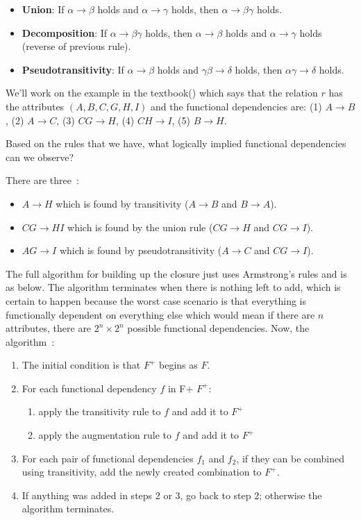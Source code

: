 \begin{itemize}
	\item \textbf{Union}: If $\alpha \rightarrow \beta$ holds and $\alpha \rightarrow \gamma$ holds, then $\alpha \rightarrow \beta\gamma$ holds.
	\item \textbf{Decomposition}: If $\alpha \rightarrow \beta\gamma$ holds, then  $\alpha \rightarrow \beta$ holds and $\alpha \rightarrow \gamma$ holds (reverse of previous rule).
	\item \textbf{Pseudotransitivity}: If $\alpha \rightarrow \beta$ holds and $\gamma\beta \rightarrow \delta$ holds, then $\alpha\gamma \rightarrow \delta$ holds.
\end{itemize}

We'll work on the example in the textbook(\cite{dsc}) which says that the relation $r$ has the attributes $(A, B, C, G, H, I)$ and the functional dependencies are: (1) $A \rightarrow B$, (2) $A \rightarrow C$, (3) $CG \rightarrow H$, (4) $CH \rightarrow I$, (5) $B \rightarrow H$.

Based on the rules that we have, what logically implied functional dependencies can we observe? 

There are three~\cite{dsc}:
\begin{itemize}
	\item $A \rightarrow H$ which is found by transitivity ($A \rightarrow B$ and $B \rightarrow A$).
	\item $CG \rightarrow HI$ which is found by the union rule ($CG \rightarrow H$ and $CG \rightarrow I$).
	\item $AG \rightarrow I$ which is found by pseudotransitivity ($A \rightarrow C$ and $CG \rightarrow I$). 
\end{itemize}

The full algorithm for building up the closure just uses Armstrong's rules and is as below. The algorithm terminates when there is nothing left to add, which is certain to happen because the worst case scenario is that everything is functionally dependent on everything else which would mean if there are $n$ attributes, there are $2^{n} \times 2^{n}$ possible functional dependencies. Now, the algorithm~\cite{dsc}:

\begin{enumerate}
	\item The initial condition is that $F^{+}$ begins as $F$.
	\item For each functional dependency $f$ in F+ $F^{+}$:
	\begin{enumerate}
		\item apply the transitivity rule to $f$ and add it to $F^{+}$
		\item apply the augmentation rule to $f$ and add it to $F^{+}$
	\end{enumerate}
	\item For each pair of functional dependencies $f_{1}$ and $f_{2}$, if they can be combined using transitivity, add the newly created combination to $F^{+}$.
	\item If anything was added in steps 2 or 3, go back to step 2; otherwise the algorithm terminates.
\end{enumerate}

